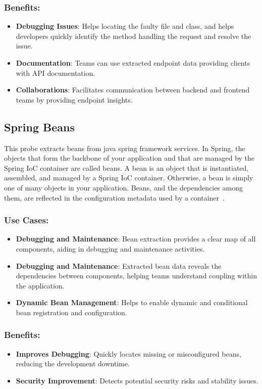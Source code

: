 \subsubsection{Benefits:}
\begin{itemize}[label=$\bullet$]
	\item \textbf{Debugging Issues}: Helps locating the faulty file and class, and helps developers quickly identify the method handling the request and resolve the issue.
	\item \textbf{Documentation}: Teams can use extracted endpoint data providing clients with API documentation.
	\item \textbf{Collaborations}: Facilitates communication between backend and frontend teams by providing endpoint insights.
\end{itemize} 

\subsection{Spring Beans}
This probe extracts beans from java spring framework services. In Spring, the objects that form the backbone of your application and that are managed by the Spring IoC container are called beans. A bean is an object that is instantiated, assembled, and managed by a Spring IoC container. Otherwise, a bean is simply one of many objects in your application. Beans, and the dependencies among them, are reflected in the configuration metadata used by a container~\citep{spring_beans_intro}.
\subsubsection{Use Cases:}
\begin{itemize}[label=$\bullet$]
	\item \textbf{Debugging and Maintenance}: Bean extraction provides a clear map of all components, aiding in debugging and maintenance activities.
	\item \textbf{Debugging and Maintenance}: Extracted bean data reveals the dependencies between components, helping teams understand coupling within the application.
	\item \textbf{Dynamic Bean Management}: Helps to enable dynamic and conditional bean registration and configuration.
\end{itemize}
\subsubsection{Benefits:}
\begin{itemize}[label=$\bullet$]
	\item \textbf{Improves Debugging}: Quickly locates missing or misconfigured beans, reducing the development downtime.
	\item \textbf{Security Improvement}: Detects potential security risks and stability issues.
\end{itemize} 


